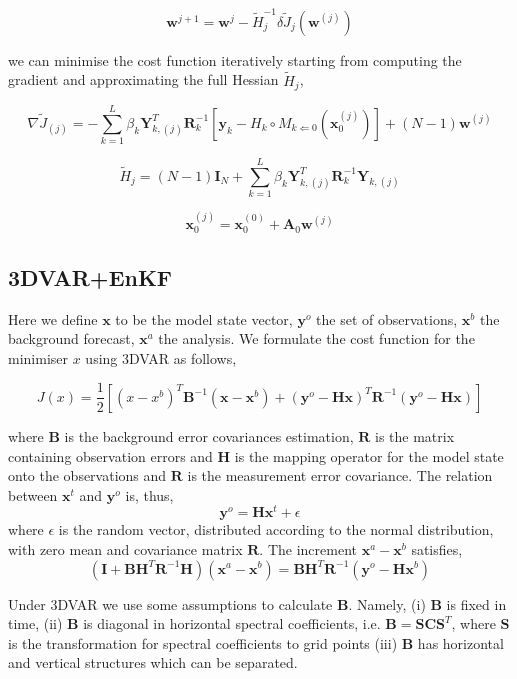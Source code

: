 \documentclass[a4,12pt]{article}
\begin{document}
$$\textbf{w}^{j+1} = \textbf{w}^{j} - \tilde{H}_{j}^{-1} \delta \tilde{J}_{j}(\textbf{w}^{(j)})$$

we can minimise the cost function iteratively starting from computing the gradient and approximating the full Hessian $\tilde{H}_{j}$,

$$\nabla \tilde{J}_{(j)} = -\sum_{k=1}^{L}\beta_{k}\textbf{Y}_{k,(j)}^{T}\textbf{R}_{k}^{-1}[\textbf{y}_{k} - H_{k}\circ M_{k\Leftarrow 0}(\textbf{x}_{0}^{(j)})] + (N-1)\textbf{w}^{(j)}$$

$$\tilde{H}_{j}=(N-1)\textbf{I}_{N}+\sum_{k=1}^{L} \beta_{k} \textbf{Y}_{k,(j)}^{T}\textbf{R}^{-1}_{k} \textbf{Y}_{k,(j)} $$

$$\textbf{x}_{0}^{(j)} = \textbf{x}_{0}^{(0)} + \textbf{A}_{0}\textbf{w}^{(j)}$$

\subsection{3DVAR+EnKF}
Here we define $\textbf{x}$ to be the model state vector, $\textbf{y}^{o}$ the set of observations, $\textbf{x}^{b}$ the background forecast, $\textbf{x}^{a}$ the analysis. We formulate the cost function for the minimiser $x$ using 3DVAR as follows,

$$J(x) = \frac{1}{2}[(x-x^{b})^{T}\textbf{B}^{-1}(\textbf{x}-\textbf{x}^{b})+(\textbf{y}^{o}-\textbf{H}\textbf{x})^{T}\textbf{R}^{-1}(\textbf{y}^{o}-\textbf{Hx})]$$

where $\textbf{B}$ is the background error covariances estimation, $\textbf{R}$ is the matrix containing observation errors and $\textbf{H}$ is the mapping operator for the model state onto the observations and  $\textbf{R}$ is the measurement error covariance. The relation between $\textbf{x}^{t}$ and $\textbf{y}^{o}$ is, thus, $$\textbf{y}^{o} = \textbf{H}\textbf{x}^{t} + \epsilon$$ where $\epsilon$ is the random vector, distributed according to the normal distribution, with zero mean and covariance matrix $\textbf{R}$. The increment $\textbf{x}^{a} - \textbf{x}^{b}$ satisfies, 
$$(\textbf{I} + \textbf{BH}^{T}\textbf{R}^{-1}\textbf{H})(\textbf{x}^{a}-\textbf{x}^{b}) = \textbf{B}\textbf{H}^{T}\textbf{R}^{-1}(\textbf{y}^{o}-\textbf{H}\textbf{x}^{b})$$   

Under 3DVAR we use some assumptions to calculate $\textbf{B}$. Namely, (i) $\textbf{B}$ is fixed in time, (ii) $\textbf{B}$ is diagonal in horizontal spectral coefficients, i.e. $\textbf{B} = \textbf{S}\textbf{C}\textbf{S}^{T}$, where $\textbf{S}$ is the transformation for spectral coefficients to grid points (iii) $\textbf{B}$ has horizontal and vertical structures which can be separated. 
\end{document}
